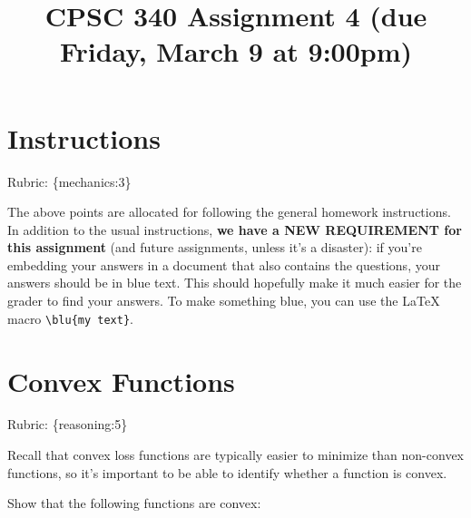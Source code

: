 \documentclass{article}
\def\rubric#1{\gre{Rubric: \{#1\}}}{}
\def\blu#1{{\color{blu}#1}}
\def\gre#1{{\color{gre}#1}}
\begin{document}
\title{CPSC 340 Assignment 4 (due Friday, March 9 at 9:00pm)}
\date{}
\maketitle

\vspace{-7em}

\section*{Instructions}
\rubric{mechanics:3}

The above points are allocated for following the general homework instructions. In addition to the usual instructions,
\textbf{we have a NEW REQUIREMENT for this assignment} (and future assignments, unless it's a disaster):
if you're embedding your answers in a document that also contains the questions,
your answers should be in \blu{blue text}. This should hopefully make it much easier for the grader to find
your answers. To make something blue, you can use the LaTeX macro \verb|\blu{my text}|.


\section{Convex Functions}
\rubric{reasoning:5}

Recall that convex loss functions are typically easier to minimize than non-convex functions, so it's important to be able to identify whether a function is convex. 

\blu{Show that the following functions are convex}:
\end{document}
